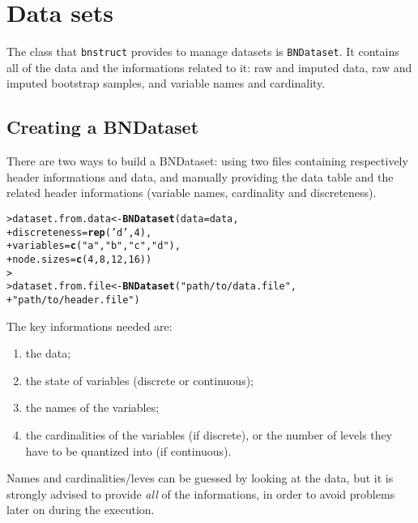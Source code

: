 \documentclass{article}\usepackage[]{graphicx}\usepackage[]{color}
\makeatletter
\newcommand{\hlnum}[1]{\textcolor[rgb]{0.686,0.059,0.569}{#1}}%
\newcommand{\hlstr}[1]{\textcolor[rgb]{0.192,0.494,0.8}{#1}}%
\newcommand{\hlstd}[1]{\textcolor[rgb]{0.345,0.345,0.345}{#1}}%
\newcommand{\hlkwb}[1]{\textcolor[rgb]{0.69,0.353,0.396}{#1}}%
\newcommand{\hlkwc}[1]{\textcolor[rgb]{0.333,0.667,0.333}{#1}}%
\newcommand{\hlkwd}[1]{\textcolor[rgb]{0.737,0.353,0.396}{\textbf{#1}}}%
\newenvironment{kframe}{%
 \def\at@end@of@kframe{}%
 \ifinner\ifhmode%
  \def\at@end@of@kframe{\end{minipage}}%
  \begin{minipage}{\columnwidth}%
 \fi\fi%
 \def\FrameCommand##1{\hskip\@totalleftmargin \hskip-\fboxsep
 \colorbox{shadecolor}{##1}\hskip-\fboxsep
     \hskip-\linewidth \hskip-\@totalleftmargin \hskip\columnwidth}%
 \MakeFramed {\advance\hsize-\width
   \@totalleftmargin\z@ \linewidth\hsize
   \@setminipage}}%
 {\par\unskip\endMakeFramed%
 \at@end@of@kframe}
\newenvironment{knitrout}{}{} %
\newcommand{\Robject}[1]{{\texttt{#1}}}
\newcommand{\Rpackage}[1]{{\texttt{#1}}}
\makeatother
\begin{document}
\section{Data sets}
The class that \Rpackage{bnstruct} provides to manage datasets is \Robject{BNDataset}.
It contains all of the data and the informations related to it: raw and imputed data, raw and imputed
bootstrap samples, and variable names and cardinality.

\subsection{Creating a BNDataset}
There are two ways to build a BNDataset: using two files containing respectively header informations
and data, and manually providing the data table and the related header informations
(variable names, cardinality and discreteness).

\begin{knitrout}
\color{fgcolor}\begin{kframe}
\begin{alltt}
\hlstd{> }\hlstd{dataset.from.data} \hlkwb{<-} \hlkwd{BNDataset}\hlstd{(}\hlkwc{data} \hlstd{= data,}
\hlstd{+ }                               \hlkwc{discreteness} \hlstd{=} \hlkwd{rep}\hlstd{(}\hlstr{'d'}\hlstd{,}\hlnum{4}\hlstd{),}
\hlstd{+ }                               \hlkwc{variables} \hlstd{=} \hlkwd{c}\hlstd{(}\hlstr{"a"}\hlstd{,} \hlstr{"b"}\hlstd{,} \hlstr{"c"}\hlstd{,} \hlstr{"d"}\hlstd{),}
\hlstd{+ }                               \hlkwc{node.sizes} \hlstd{=} \hlkwd{c}\hlstd{(}\hlnum{4}\hlstd{,}\hlnum{8}\hlstd{,}\hlnum{12}\hlstd{,}\hlnum{16}\hlstd{))}
\hlstd{> }
\hlstd{> }\hlstd{dataset.from.file} \hlkwb{<-} \hlkwd{BNDataset}\hlstd{(}\hlstr{"path/to/data.file"}\hlstd{,}
\hlstd{+ }                               \hlstr{"path/to/header.file"}\hlstd{)}
\end{alltt}
\end{kframe}
\end{knitrout}

The key informations needed are:
\begin{enumerate}
\item the data;
\item the state of variables (discrete or continuous);
\item the names of the variables;
\item the cardinalities of the variables (if discrete), or the number of levels they have to be quantized into
(if continuous). 
\end{enumerate}
Names and cardinalities/leves can be guessed by looking at the data, but it is strongly advised to provide
\textit{all} of the informations, in order to avoid problems later on during the execution.
\end{document}

